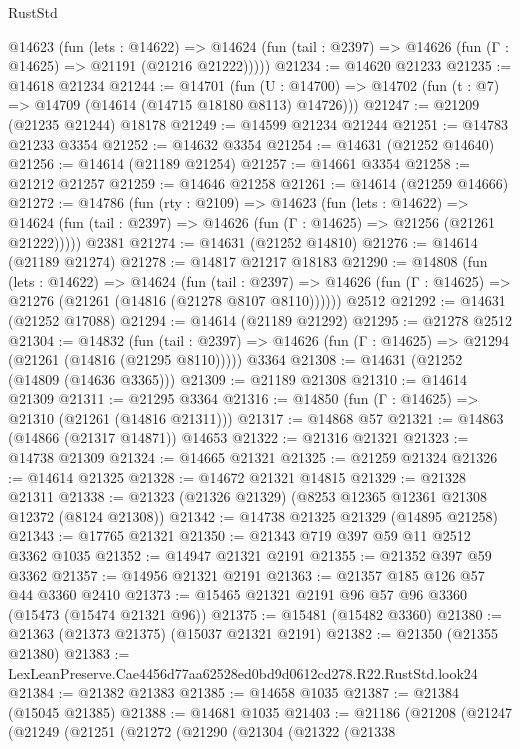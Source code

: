 \begin{lexlean}{RustStd}
\begin{coremodule}
    @14623
      (fun (lets : @14622) =>
      @14624 (fun (tail : @2397) => @14626 (fun (Γ : @14625) => @21191 (@21216 @21222)))))
@21234 := @14620 @21233
@21235 := @14618 @21234
@21244 := @14701
    (fun (U : @14700) => @14702 (fun (t : @7) => @14709 (@14614 (@14715 @18180 @8113) @14726)))
@21247 := @21209 (@21235 @21244) @18178
@21249 := @14599 @21234 @21244
@21251 := @14783 @21233 @3354
@21252 := @14632 @3354
@21254 := @14631 (@21252 @14640)
@21256 := @14614 (@21189 @21254)
@21257 := @14661 @3354
@21258 := @21212 @21257
@21259 := @14646 @21258
@21261 := @14614 (@21259 @14666)
@21272 := @14786
    (fun (rty : @2109) =>
    @14623
      (fun (lets : @14622) =>
      @14624 (fun (tail : @2397) => @14626 (fun (Γ : @14625) => @21256 (@21261 @21222)))))
    @2381
@21274 := @14631 (@21252 @14810)
@21276 := @14614 (@21189 @21274)
@21278 := @14817 @21217 @18183
@21290 := @14808
    (fun (lets : @14622) =>
    @14624
      (fun (tail : @2397) =>
      @14626 (fun (Γ : @14625) => @21276 (@21261 (@14816 (@21278 @8107 @8110))))))
    @2512
@21292 := @14631 (@21252 @17088)
@21294 := @14614 (@21189 @21292)
@21295 := @21278 @2512
@21304 := @14832
    (fun (tail : @2397) => @14626 (fun (Γ : @14625) => @21294 (@21261 (@14816 (@21295 @8110)))))
    @3364
@21308 := @14631 (@21252 (@14809 (@14636 @3365)))
@21309 := @21189 @21308
@21310 := @14614 @21309
@21311 := @21295 @3364
@21316 := @14850 (fun (Γ : @14625) => @21310 (@21261 (@14816 @21311)))
@21317 := @14868 @57
@21321 := @14863 (@14866 (@21317 @14871)) @14653
@21322 := @21316 @21321
@21323 := @14738 @21309
@21324 := @14665 @21321
@21325 := @21259 @21324
@21326 := @14614 @21325
@21328 := @14672 @21321 @14815
@21329 := @21328 @21311
@21338 := @21323 (@21326 @21329) (@8253 @12365 @12361 @21308 @12372 (@8124 @21308))
@21342 := @14738 @21325 @21329 (@14895 @21258)
@21343 := @17765 @21321
@21350 := @21343 @719 @397 @59 @11 @2512 @3362 @1035
@21352 := @14947 @21321 @2191
@21355 := @21352 @397 @59 @3362
@21357 := @14956 @21321 @2191
@21363 := @21357 @185 @126 @57 @44 @3360 @2410
@21373 := @15465 @21321 @2191 @96 @57 @96 @3360 (@15473 (@15474 @21321 @96))
@21375 := @15481 (@15482 @3360)
@21380 := @21363 (@21373 @21375) (@15037 @21321 @2191)
@21382 := @21350 (@21355 @21380)
@21383 := LexLeanPreserve.Cae4456d77aa62528ed0bd9d0612cd278.R22.RustStd.look24
@21384 := @21382 @21383
@21385 := @14658 @1035
@21387 := @21384 (@15045 @21385)
@21388 := @14681 @1035
@21403 := @21186
    (@21208
      (@21247
        (@21249
          (@21251
            (@21272
              (@21290
                (@21304
                  (@21322
                    (@21338

\end{coremodule}
\end{lexlean}
